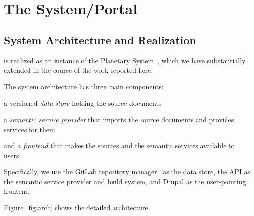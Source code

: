 \section{The \sys System/Portal}\label{sec:mathhub}

\subsection{System Architecture and Realization}\label{sec:arch}

\sys is realized as an instance of the Planetary System~\cite{Kohlhase:ppte12}, which we
have substantially extended in the course of the work reported here.

The system architecture has three main components: 
\begin{compactenum}[\em i\rm)]
 \item a versioned \emph{data store} holding the source documents
 \item a \emph{semantic service provider} that imports the source documents and provides services for them 
 \item and a \emph{frontend} that makes the sources and the semantic services available to users.
\end{compactenum}
Specifically, we use the GitLab repository manager~\cite{GitLab:on} as the data store, the
\mmt API as the semantic service provider and build system, and Drupal as the
user-pointing frontend.

Figure~\ref{fig:arch} shows the detailed architecture.

